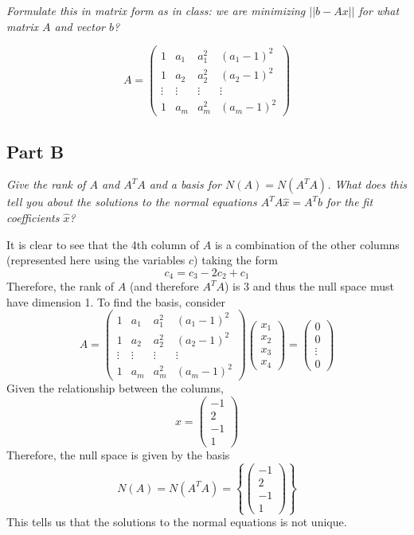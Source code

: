 \documentclass{article}
\begin{document}
\textit{Formulate this in matrix form as in class: we are minimizing $|| b -
Ax ||$ for what matrix $A$ and vector $b$?}

\bigbreak

$$ A = \begin{pmatrix}
    1 & a_1 & a_1^2 & (a_1 - 1)^2 \\
    1 & a_2 & a_2^2 & (a_2 - 1)^2 \\
    \vdots & \vdots & \vdots & \vdots \\
    1 & a_m & a_m^2 & (a_m - 1)^2
\end{pmatrix} $$

\subsection*{Part B}

\textit{Give the rank of $A$ and $A^T A$ and a basis for $N(A) = N(A^T A)$.
What does this tell you about the solutions to the normal equations $A^T A
\hat{x} = A^T b$ for the fit coefficients $\hat{x}$?}

\bigbreak

It is clear to see that the 4th column of $A$ is a combination of the other
columns (represented here using the variables $c$) taking the form
$$ c_4 = c_3 - 2 c_2 + c_1 $$
Therefore, the rank of $A$ (and therefore $A^T A$) is 3 and thus the null
space must have dimension 1. To find the basis, consider
$$ A = \begin{pmatrix}
    1 & a_1 & a_1^2 & (a_1 - 1)^2 \\
    1 & a_2 & a_2^2 & (a_2 - 1)^2 \\
    \vdots & \vdots & \vdots & \vdots \\
    1 & a_m & a_m^2 & (a_m - 1)^2
\end{pmatrix} \begin{pmatrix}
    x_1 \\
    x_2 \\
    x_3 \\
    x_4
\end{pmatrix} = \begin{pmatrix}
    0 \\
    0 \\
    \vdots \\
    0
\end{pmatrix} $$
Given the relationship between the columns,
$$ x = \begin{pmatrix}
    -1 \\
    2 \\
    -1 \\
    1
\end{pmatrix} $$
Therefore, the null space is given by the basis
$$ N(A) = N(A^T A) = \left\{ \begin{pmatrix}
    -1 \\
    2 \\
    -1 \\
    1
\end{pmatrix} \right\} $$
This tells us that the solutions to the normal equations is not unique.
\end{document}
